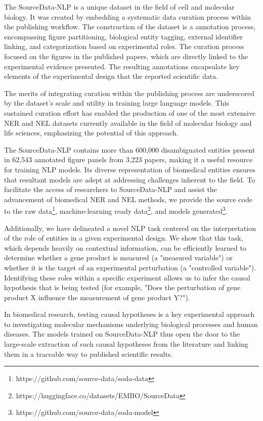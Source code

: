\documentclass{bioinfo}
\begin{document}
The SourceData-NLP is a unique dataset in the field of cell and molecular biology. It was created by embedding a systematic data curation process within the publishing workflow. The construction of the dataset is a annotation process, encompassing figure partitioning, biological entity tagging, external identifier linking, and categorization based on experimental roles. The curation process focused on the figures in the published papers, which are directly linked to the experimental evidence presented. The resulting annotations encapsulate key elements of the experimental design that the reported scientific data.

The merits of integrating curation within the publishing process are underscored by the dataset's scale and utility in training large language models. This sustained curation effort has enabled the production of one of the most extensive NER and NEL datasets currently available in the field of molecular biology and life sciences, emphasizing the potential of this approach. 

The SourceData-NLP contains more than 600,000 disambiguated entities present in 62,543 annotated figure panels from 3,223 papers, making it a useful resource for training NLP models. Its diverse representation of biomedical entities ensures that resultant models are adept at addressing challenges inherent to the field. To facilitate the access of researchers to SourceData-NLP and assist the advancement of biomedical NER and NEL methods, we provide the source code to the raw data\footnote{https://github.com/source-data/soda-data}, machine-learning ready data\footnote{https://huggingface.co/datasets/EMBO/SourceData}, and models generated\footnote{https://github.com/source-data/soda-model}. 

Additionally, we have delineated a novel NLP task centered on the interpretation of the role of entities in a given experimental design. We show that this task, which depends heavily on contextual information, can be efficiently learned to determine whether a gene product is measured (a "measured variable") or whether it is the target of an experimental perturbation (a "controlled variable"). Identifying these roles within a specific experiment allows us to infer the causal hypothesis that is being tested (for example, "Does the perturbation of gene product X influence the measurement of gene product Y?"). 

In biomedical research, testing causal hypotheses is a key experimental approach to investigating molecular mechanisms underlying biological processes and human diseases. The models trained on SourceData-NLP thus open the door to the large-scale extraction of such causal hypotheses from the literature and linking them in a traceable way to published scientific results.
\end{document}
